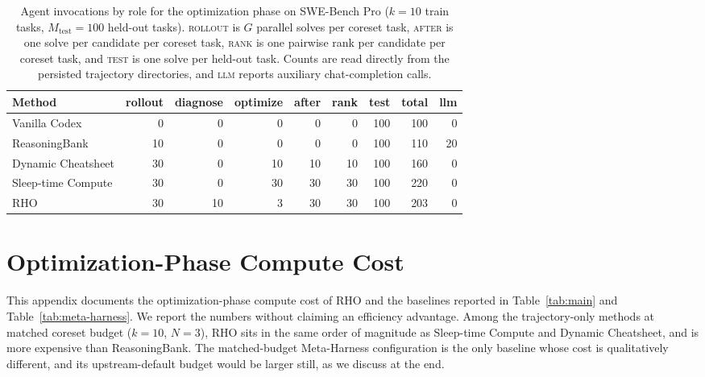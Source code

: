 \documentclass{llmxive}
\providecommand{\method}{\textsc{RHO}}
\begin{document}
\begin{table}[t]
\centering
\small
\begin{tabular}{lrrrrrrrr}
\toprule
\textbf{Method} & \textbf{rollout} & \textbf{diagnose} & \textbf{optimize} & \textbf{after} & \textbf{rank} & \textbf{test} & \textbf{total} & \textbf{llm} \\
\midrule
Vanilla Codex                              &   0 &  0 &  0 &  0 &  0 & 100 & 100 &  0 \\
ReasoningBank \citep{ouyang2026reasoningbank}   &  10 &  0 &  0 &  0 &  0 & 100 & 110 & 20 \\
Dynamic Cheatsheet \citep{suzgun2025dynamiccheatsheet} &  30 &  0 & 10 & 10 & 10 & 100 & 160 &  0 \\
Sleep-time Compute \citep{lin2025sleeptime}        &  30 &  0 & 30 & 30 & 30 & 100 & 220 &  0 \\
\method{}                            &  30 & 10 &  3 & 30 & 30 & 100 & 203 &  0 \\
\bottomrule
\end{tabular}
\caption{Agent invocations by role for the optimization phase on SWE-Bench Pro ($k=10$ train tasks, $M_{\mathrm{test}}=100$ held-out tasks). \textsc{rollout} is $G$ parallel solves per coreset task, \textsc{after} is one solve per candidate per coreset task, \textsc{rank} is one pairwise rank per candidate per coreset task, and \textsc{test} is one solve per held-out task. Counts are read directly from the persisted trajectory directories, and \textsc{llm} reports auxiliary chat-completion calls.}
\label{tab:cost-breakdown}
\end{table}

\section{Optimization-Phase Compute Cost}\label{app:cost}

This appendix documents the optimization-phase compute cost of \method{} and the baselines reported in Table~\ref{tab:main} and Table~\ref{tab:meta-harness}.
We report the numbers without claiming an efficiency advantage. Among the trajectory-only methods at matched coreset budget ($k=10$, $N=3$), \method{} sits in the same order of magnitude as Sleep-time Compute and Dynamic Cheatsheet, and is more expensive than ReasoningBank.
The matched-budget Meta-Harness configuration is the only baseline whose cost is qualitatively different, and its upstream-default budget would be larger still, as we discuss at the end.
\end{document}
